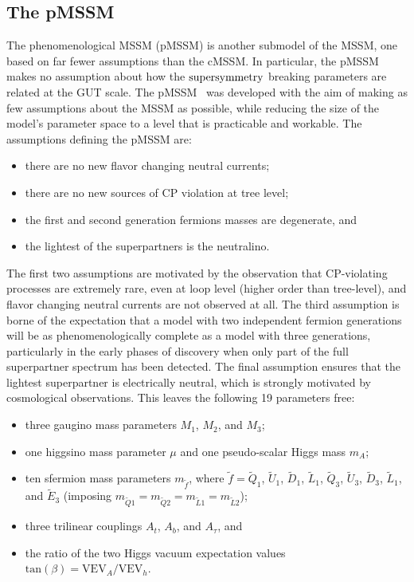 \subsection{The pMSSM}
\label{sec:pmssm}
The phenomenological MSSM (pMSSM) is another submodel of the MSSM, one based on far fewer assumptions than the cMSSM. In particular, the pMSSM makes no assumption about how the $\text{supersymmetry}$ breaking parameters are related at the GUT scale. The pMSSM~\cite{Berger:2008cq} was developed with the aim of making as few assumptions about the MSSM as possible, while reducing the size of the model's parameter space to a level that is practicable and workable. The assumptions defining the pMSSM are:
\begin{itemize}
\item{there are no new flavor changing neutral currents;}
\item{there are no new sources of CP violation at tree level;}
\item{the first and second generation fermions masses are degenerate, and}
\item{the lightest of the superpartners is the neutralino.}
\end{itemize}
The first two assumptions are motivated by the observation that CP-violating processes are extremely rare, even at loop level (higher order than tree-level), and flavor changing neutral currents are not observed at all. The third assumption is borne of the expectation that a model with two independent fermion generations will be as phenomenologically complete as a model with three generations, particularly in the early phases of discovery when only part of the full superpartner spectrum has been detected. The final assumption ensures that the lightest superpartner is electrically neutral, which is strongly motivated by cosmological observations. This leaves the following 19 parameters free:
\begin{itemize}
\item{three gaugino mass parameters {\color{red}$M_1$}, {\color{red}$M_2$}, and {\color{red}$M_3$};}
\item{one higgsino mass parameter $\mu$ and one pseudo-scalar Higgs mass $m_A$;}
\item{ten sfermion mass parameters {\color{blue}$m_{\tilde{f}}$}, where $\tilde{f}=\tilde{Q}_1$, $\tilde{U}_1$, $\tilde{D}_1$, $\tilde{L}_1$,  $\tilde{Q}_3$, $\tilde{U}_3$, $\tilde{D}_3$, $\tilde{L}_1$, and $\tilde{E}_3$ (imposing $m_{\tilde{Q}1}=m_{\tilde{Q}2}=m_{\tilde{L}1}=m_{\tilde{L}2}$);}
\item{three trilinear couplings {\color{Green}$A_t$}, {\color{Green}$A_b$}, and {\color{Green}$A_\tau$}, and}
\item{the ratio of the two Higgs vacuum expectation values $\text{tan}(\beta)=\text{VEV}_A/\text{VEV}_h$.}
\end{itemize}

